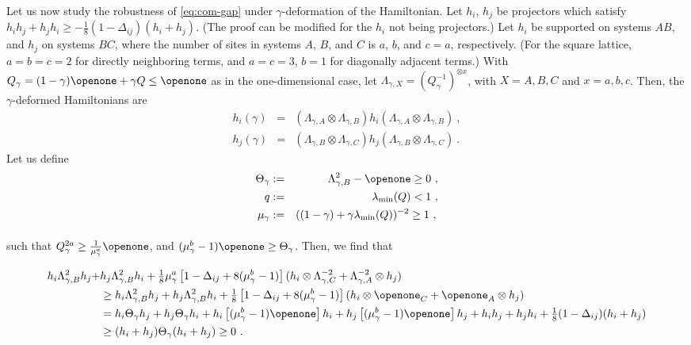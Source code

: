 \documentclass[twocolumn,superscriptaddress,prb,linenumbers]{revtex4-1}
\begin{document}
Let us now study the robustness of \eqref{eq:com-gap} under
$\gamma$-deformation of the Hamiltonian.  Let $h_i$, $h_j$ be projectors
which satisfy $h_ih_j+h_jh_i\ge -\tfrac18(1-\Delta_{ij})(h_i+h_j)$. (The
proof can be modified for the $h_i$ not being projectors.) Let $h_i$ be
supported on systems $AB$, and $h_j$ on systems $BC$, where the number of
sites in systems $A$, $B$, and $C$ is $a$, $b$, and $c=a$,
respectively. (For the square lattice, $a=b=c=2$ for directly neighboring
terms, and $a=c=3$, $b=1$ for diagonally adjacent terms.) With
$Q_\gamma=(1-\gamma)\openone+\gamma Q\le\openone$ as in the
one-dimensional case, let
$\Lambda_{\gamma,X}=\left(Q_\gamma^{-1}\right)^{\otimes x}$, with
$X=A,B,C$ and $x=a,b,c$. Then, the $\gamma$-deformed Hamiltonians are
\begin{eqnarray*}
    h_i(\gamma)&=&(\Lambda_{\gamma,A}\otimes
    \Lambda_{\gamma,B})h_i(\Lambda_{\gamma,A}\otimes\Lambda_{\gamma,B})\ ,
    \\
    h_j(\gamma)&=&(\Lambda_{\gamma,B}\otimes
    \Lambda_{\gamma,C})h_j(\Lambda_{\gamma,B}\otimes\Lambda_{\gamma,C})\ .
\end{eqnarray*}
Let us define
\begin{eqnarray*}
    \Theta_\gamma&:=&\Lambda_{\gamma,B}^2-\openone\ge0\ ,
    \\
    q&:=&\lambda_{\min}(Q)<1\ ,
    \\
    \mu_\gamma&:=&((1-\gamma)+\gamma \lambda_{\min}(Q))^{-2}\ge1\ ,
    \rule[-0.4cm]{0cm}{0.4cm}
\end{eqnarray*}
such that $Q_\gamma^{2a}\ge
    \tfrac{1}{\mu_\gamma^a}\openone$, and
$(\mu_\gamma^b-1)\openone\ge\Theta_\gamma$.
Then, we find  that
\begin{widetext}
    \begin{align*}
        h_i\Lambda_{\gamma,B}^2h_j+ & h_j\Lambda_{\gamma,B}^2h_i+
        \tfrac18
        \mu^a_\gamma \left[ 1-\Delta_{ij}+8(\mu_\gamma^b-1)\right] (h_i\otimes
        \Lambda_{\gamma,C}^{-2}+\Lambda_{\gamma,A}^{-2}\otimes h_j)                              \\
                                    & \ge h_i\Lambda_{\gamma,B}^2h_j+h_j\Lambda_{\gamma,B}^2h_i+
        \tfrac18
        \left[1-\Delta_{ij}+8(\mu^b_\gamma-1)\right]
        (h_i\otimes
        \openone_C+\openone_A\otimes h_j)                                                        \\
                                    & =
        h_i\Theta_\gamma h_j+h_j\Theta_\gamma h_i+
        h_i\left[ (\mu^b_\gamma-1)\openone\right] h_i+h_j\left[
            (\mu^b_\gamma-1)\openone\right] h_j +
        h_ih_j+h_jh_i+\tfrac18(1-\Delta_{ij})(h_i+h_j)
        \\
                                    & \ge
        (h_i+h_j)\Theta_\gamma(h_i+h_j)\ge 0\ .
    \end{align*}
\end{widetext}
\end{document}
